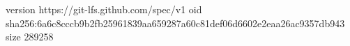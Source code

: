 version https://git-lfs.github.com/spec/v1
oid sha256:6a6c8cccb9b2fb25961839aa659287a60c81def06d6602e2eaa26ac9357db943
size 289258
